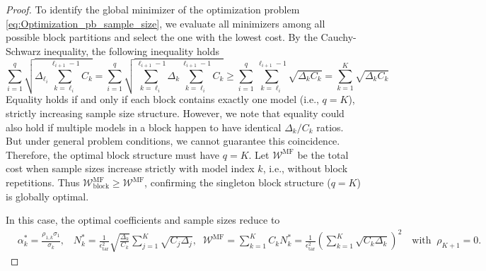 \begin{proof}
To identify the global minimizer of the optimization problem \eqref{eq:Optimization_pb_sample_size}, we evaluate all minimizers among all possible block partitions
and select the one with the lowest cost. By the Cauchy-Schwarz inequality, the following inequality holds
%
\[
\sum_{i=1}^q \sqrt{ \Delta_{\ell_i} \sum_{k=\ell_i}^{\ell_{i+1}-1} C_k }  = \sum_{i=1}^q \sqrt{ \sum_{k=\ell_i}^{\ell_{i+1}-1}\Delta_k \sum_{k=\ell_i}^{\ell_{i+1}-1} C_k } \ge \sum_{i=1}^q \sum_{k=\ell_i}^{\ell_{i+1}-1} \sqrt{\Delta_k C_k} = \sum_{k=1}^K \sqrt{\Delta_k C_k}
\]
%
Equality holds if and only if each block contains exactly one model (i.e., $q=K$), strictly increasing sample size structure. However, we note that equality could also hold if multiple models in a block happen to have identical $\Delta_k/C_k$ ratios. But under general problem conditions, we cannot guarantee this coincidence. Therefore, the optimal block structure must have $q=K$. Let $\mathcal{W}^\text{MF}$ be the total cost when sample sizes increase strictly with model index $k$, i.e., without block repetitions. Thus $\mathcal{W}_{\text{block}}^{\text{MF}} \geq \mathcal{W}^{\text{MF}}$, confirming the singleton block structure ($q=K$) is globally optimal. 


In this case, the optimal coefficients and sample sizes reduce to
%
\begin{align*}
    \label{eq:MFMC_SampleSize}
    &\alpha_k^*=\frac{\rho_{1,k}\sigma_1}{\sigma_k},\;\; \;N_k^*=\frac{1}{\epsilon_\text{tar}^2}\sqrt{\frac{\Delta_k}{C_k}}\sum_{j=1}^K\sqrt{C_j\Delta_j},\;\; \mathcal{W}^\text{MF} = \sum_{k=1}^K C_k N_k^* = \frac{1}{\epsilon_{\text{tar}}^2}\left(\sum_{k=1}^K\sqrt{C_k\Delta_k}\right)^2\quad \text{with}\;\;\rho_{K+1}=0.
\end{align*}
%










\end{proof}



